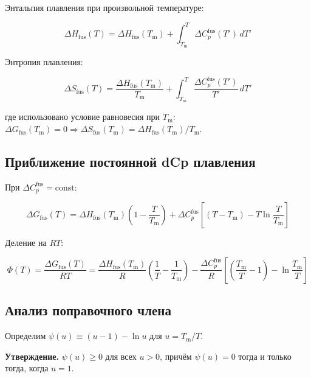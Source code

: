 \documentclass[11pt]{article}
\begin{document}
Энтальпия плавления при произвольной температуре:

\begin{equation*}
\Delta H_{\mathrm{fus}}(T) = \Delta H_{\mathrm{fus}}(T_{\mathrm{m}}) + \int_{T_{\mathrm{m}}}^{T} \Delta C_p^{\mathrm{fus}}(T') \, dT'
\end{equation*}

Энтропия плавления:

\begin{equation*}
\Delta S_{\mathrm{fus}}(T) = \frac{\Delta H_{\mathrm{fus}}(T_{\mathrm{m}})}{T_{\mathrm{m}}} + \int_{T_{\mathrm{m}}}^{T} \frac{\Delta C_p^{\mathrm{fus}}(T')}{T'} \, dT'
\end{equation*}

где использовано условие равновесия при $T_{\mathrm{m}}$: $\Delta G_{\mathrm{fus}}(T_{\mathrm{m}}) = 0 \Rightarrow \Delta S_{\mathrm{fus}}(T_{\mathrm{m}}) = \Delta H_{\mathrm{fus}}(T_{\mathrm{m}}) / T_{\mathrm{m}}$.

\subsection{Приближение постоянной dCp плавления}

При $\Delta C_p^{\mathrm{fus}} = \mathrm{const}$:

\begin{equation*}
\Delta G_{\mathrm{fus}}(T) = \Delta H_{\mathrm{fus}}(T_{\mathrm{m}})\!\left(1 - \frac{T}{T_{\mathrm{m}}}\right) + \Delta C_p^{\mathrm{fus}}\!\left[(T - T_{\mathrm{m}}) - T \ln\frac{T}{T_{\mathrm{m}}}\right]
\end{equation*}

Деление на $RT$:

\begin{equation*}
\Phi(T) = \frac{\Delta G_{\mathrm{fus}}(T)}{RT} = \frac{\Delta H_{\mathrm{fus}}(T_{\mathrm{m}})}{R}\!\left(\frac{1}{T} - \frac{1}{T_{\mathrm{m}}}\right) - \frac{\Delta C_p^{\mathrm{fus}}}{R}\!\left[\left(\frac{T_{\mathrm{m}}}{T} - 1\right) - \ln\frac{T_{\mathrm{m}}}{T}\right]
\end{equation*}

\subsection{Анализ поправочного члена}

Определим $\psi(u) \equiv (u - 1) - \ln u$ для $u = T_{\mathrm{m}} / T$.

\textbf{Утверждение.} $\psi(u) \geq 0$ для всех $u > 0$, причём $\psi(u) = 0$ тогда и только тогда, когда $u = 1$.
\end{document}
